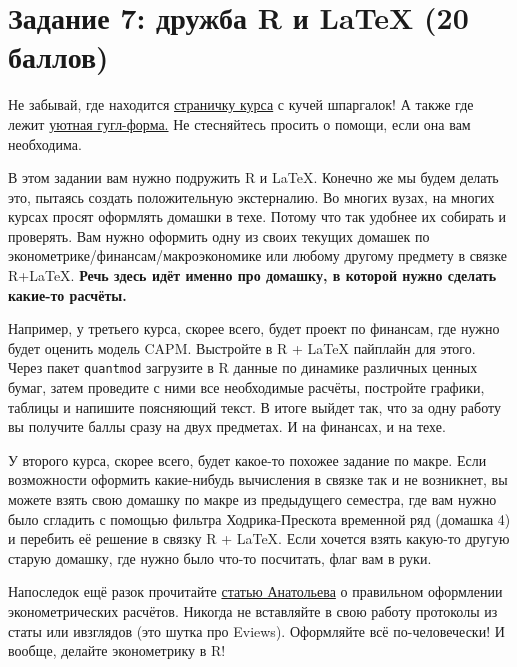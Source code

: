 \documentclass[12pt, a4paper, oneside]{article}
\begin{document}
	
\section*{Задание 7:  дружба R и LaTeX (20  баллов) }

Не забывай, где находится  \href{https://fulyankin.github.io/LaTeX/}{страничку курса} с кучей шпаргалок! А также где лежит \href{https://docs.google.com/forms/d/e/1FAIpQLSe11kxKVfv07iCL1E9yNX7ll9swKImiVwRr1H70lslGzInRSg/viewform}{уютная гугл-форма.} Не стесняйтесь просить о помощи, если она вам необходима. 

В этом задании вам нужно подружить R и \LaTeX{}. Конечно же мы будем делать это, пытаясь создать положительную экстерналию. Во многих вузах, на многих курсах просят оформлять домашки в техе. Потому что так удобнее их собирать и проверять. Вам нужно оформить одну из своих текущих домашек по эконометрике/финансам/макроэкономике или любому другому предмету в связке R+\LaTeX.  \textbf{Речь здесь идёт именно про домашку, в которой нужно сделать какие-то расчёты.}

Например, у третьего курса, скорее всего, будет проект по финансам, где нужно будет оценить модель CAPM. Выстройте в R + \LaTeX{} пайплайн для этого. Через пакет \texttt{quantmod}  загрузите в R данные по динамике различных ценных бумаг, затем проведите с ними все необходимые расчёты, постройте графики, таблицы и напишите поясняющий текст. В итоге выйдет так, что за одну работу вы получите баллы сразу на двух предметах. И на финансах, и на техе. 

У второго курса, скорее всего, будет какое-то похожее задание по макре. Если возможности оформить какие-нибудь вычисления в связке так и не возникнет, вы можете взять свою домашку по макре из предыдущего семестра, где вам нужно было сгладить с помощью фильтра Ходрика-Прескота временной ряд (домашка 4) и перебить её решение в связку R + \LaTeX.  Если хочется взять какую-то другую старую домашку, где нужно было что-то посчитать, флаг вам в руки. 

Напоследок ещё разок прочитайте \href{https://github.com/FUlyankin/LaTeX/raw/master/Logi_2018/sem_5/Anatolyev.pdf}{статью Анатольева} о правильном оформлении эконометрических расчётов. Никогда не вставляйте в свою работу протоколы из статы или ивзглядов (это шутка про Eviews). Оформляйте всё по-человечески!  И вообще, делайте эконометрику в R!
\end{document}
